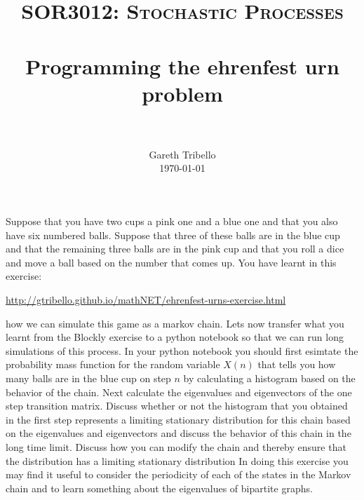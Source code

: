\documentclass[paper=a4, fontsize=11pt]{scrartcl}
\title{\usefont{OT1}{bch}{b}{n} \normalfont \normalsize \textsc{SOR3012:
Stochastic Processes} \\ [25pt] \horrule{0.5pt} \\[0.4cm] 
\huge Programming the ehrenfest urn problem \\
\horrule{2pt} \\[0.25cm]
}
\author{ \normalfont
\normalsize
        Gareth Tribello \\[-3pt] \normalsize
        \today
}
\date{}
\numberwithin{equation}{section}
\numberwithin{figure}{section}
\numberwithin{table}{section}
\begin{document}
\maketitle

Suppose that you have two cups a pink one and a blue one and that you also have six numbered balls.  Suppose that three of these balls are in the blue cup and that
the remaining three balls are in the pink cup and that you roll a dice and move a ball based on the number that comes up.  You have learnt in this exercise:

\href{http://gtribello.github.io/mathNET/ehrenfest-urns-exercise.html}{http://gtribello.github.io/mathNET/ehrenfest-urns-exercise.html}

how we can simulate this game as a markov chain.  Lets now transfer what you learnt from the Blockly exercise to a python notebook so that we can run long simulations 
of this process.  In your python notebook you should first esimtate the probability mass function for the random variable $X(n)$ that tells you how many balls are in the 
blue cup on step $n$ by calculating a histogram based on the behavior of the chain.  Next calculate the eigenvalues and eigenvectors of the one step transition matrix.  
Discuss whether or not the histogram that you obtained in the first step represents a limiting stationary distribution for this chain based on the eigenvalues and eigenvectors 
and discuss the behavior of this chain in the long time limit.  Discuss how you can modify the chain and thereby ensure that the distribution has a limiting stationary distribution
In doing this exercise you may find it useful to consider the periodicity of each of the states in the Markov chain and to learn something about the eigenvalues of bipartite graphs.
\end{document}
